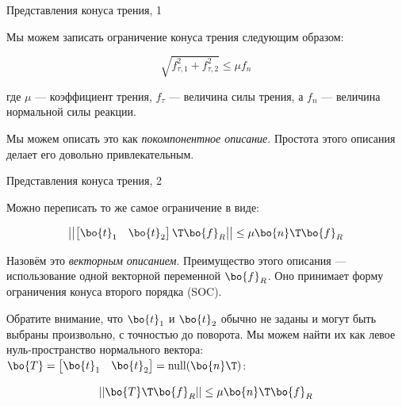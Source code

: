 \documentclass{beamer}
\begin{document}
\begin{frame}{Представления конуса трения, 1}
	\begin{flushleft}
		
		Мы можем записать ограничение конуса трения следующим образом:
		
		\begin{equation}
			\sqrt{f_{\tau, 1}^2 + f_{\tau, 2}^2} \leq \mu f_n
		\end{equation}
		
		где $\mu$ — коэффициент трения, $f_\tau$ — величина силы трения, а $f_n$ — величина нормальной силы реакции.
		
		\bigskip
		
		Мы можем описать это как \emph{покомпонентное описание}. Простота этого описания делает его довольно привлекательным.
		
		
	\end{flushleft}
\end{frame}


\begin{frame}{Представления конуса трения, 2}
	\begin{flushleft}
		
		Можно переписать то же самое ограничение в виде:
		
		\begin{equation}
			\left|\left| \begin{bmatrix}
				\bo{t}_1 & \bo{t}_2
			\end{bmatrix}\T
			\bo{f}_R \right|\right| 
			\leq \mu \bo{n}\T \bo{f}_R
		\end{equation}
		
		Назовём это \emph{векторным описанием}. Преимущество этого описания — использование одной векторной переменной $\bo{f}_R$. Оно принимает форму ограничения конуса второго порядка (SOC).
		
		\bigskip
		
		Обратите внимание, что $\bo{t}_1$ и $\bo{t}_2$ обычно не заданы и могут быть выбраны произвольно, с точностью до поворота. Мы можем найти их как левое нуль-пространство нормального вектора: $\bo{T} = \begin{bmatrix}
			\bo{t}_1 & \bo{t}_2
		\end{bmatrix} = \text{null}(\bo{n}\T)$: 
		
		\begin{equation}
			|| \bo{T}\T\bo{f}_R ||
			\leq \mu \bo{n}\T \bo{f}_R
		\end{equation}
		
	\end{flushleft}
\end{frame}
\end{document}
